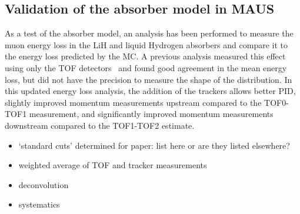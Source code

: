 \subsection{Validation of the absorber model in MAUS}
\label{SubSect:Absorber_Validation}

As a test of the absorber model, an analysis has been performed to measure the muon energy loss in the LiH and liquid Hydrogen absorbers and compare it to the energy loss predicted by the MC.  A previous analysis measured this effect using only the TOF detectors~\cite{rhys_thesis} and found good agreement in the mean energy loss, but did not have the precision to measure the shape of the distribution.  In this updated energy loss analysis, the addition of the trackers allows better PID, slightly improved momentum measurements upstream compared to the TOF0-TOF1 measurement, and significantly improved momentum measurements downstream compared to the TOF1-TOF2 estimate.

{\color{red}
\begin{itemize}
\item `standard cuts' determined for paper: list here or are they listed elsewhere?
\item weighted average of TOF and tracker measurements
\item deconvolution
\item systematics
\end{itemize}
}


